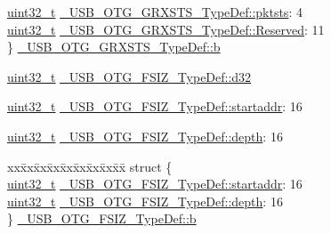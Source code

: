 \begin{DoxyCompactItemize}
\begin{tabbing}
\>\hyperlink{stdint_8h_a435d1572bf3f880d55459d9805097f62}{uint32\_t} \hyperlink{group___u_s_b___o_t_g___d_r_i_v_e_r_ga686db23028035b8ec903aaedd0f1e3c1}{\_USB\_OTG\_GRXSTS\_TypeDef::pktsts}: 4\\
\>\hyperlink{stdint_8h_a435d1572bf3f880d55459d9805097f62}{uint32\_t} \hyperlink{group___u_s_b___o_t_g___d_r_i_v_e_r_gac6ed8ae7244e39a9103516aaa72d4437}{\_USB\_OTG\_GRXSTS\_TypeDef::Reserved}: 11\\
\} \hyperlink{group___u_s_b___o_t_g___d_r_i_v_e_r_gad746c43da68af26662793c5c15a5c0a1}{\_USB\_OTG\_GRXSTS\_TypeDef::b}\\

\end{tabbing}\item 
\hyperlink{stdint_8h_a435d1572bf3f880d55459d9805097f62}{uint32\-\_\-t} \hyperlink{group___u_s_b___o_t_g___d_r_i_v_e_r_ga14d845ee3d6d63ffda6e97083de02de5}{\-\_\-\-U\-S\-B\-\_\-\-O\-T\-G\-\_\-\-F\-S\-I\-Z\-\_\-\-Type\-Def\-::d32}
\item 
\hyperlink{stdint_8h_a435d1572bf3f880d55459d9805097f62}{uint32\-\_\-t} \hyperlink{group___u_s_b___o_t_g___d_r_i_v_e_r_ga57e8b7f8a3e82860d5c7e6e95266ca71}{\-\_\-\-U\-S\-B\-\_\-\-O\-T\-G\-\_\-\-F\-S\-I\-Z\-\_\-\-Type\-Def\-::startaddr}\-: 16
\item 
\hyperlink{stdint_8h_a435d1572bf3f880d55459d9805097f62}{uint32\-\_\-t} \hyperlink{group___u_s_b___o_t_g___d_r_i_v_e_r_gaecd6fc1354e12e8da341d975571922c5}{\-\_\-\-U\-S\-B\-\_\-\-O\-T\-G\-\_\-\-F\-S\-I\-Z\-\_\-\-Type\-Def\-::depth}\-: 16
\item 
\begin{tabbing}
xx\=xx\=xx\=xx\=xx\=xx\=xx\=xx\=xx\=\kill
struct \{\\
\>\hyperlink{stdint_8h_a435d1572bf3f880d55459d9805097f62}{uint32\_t} \hyperlink{group___u_s_b___o_t_g___d_r_i_v_e_r_ga57e8b7f8a3e82860d5c7e6e95266ca71}{\_USB\_OTG\_FSIZ\_TypeDef::startaddr}: 16\\
\>\hyperlink{stdint_8h_a435d1572bf3f880d55459d9805097f62}{uint32\_t} \hyperlink{group___u_s_b___o_t_g___d_r_i_v_e_r_gaecd6fc1354e12e8da341d975571922c5}{\_USB\_OTG\_FSIZ\_TypeDef::depth}: 16\\
\} \hyperlink{group___u_s_b___o_t_g___d_r_i_v_e_r_gaa74e396b6f09634d2daa7550b339cbaa}{\_USB\_OTG\_FSIZ\_TypeDef::b}\\


\end{tabbing}
\end{DoxyCompactItemize}
